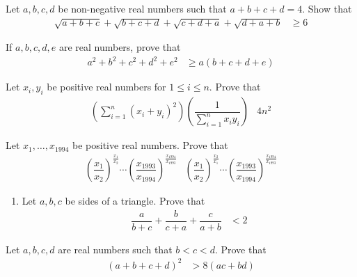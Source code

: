 \documentclass{subfile}
\begin{document}
		\begin{problem}
			Let $a,b,c,d$ be non-negative real numbers such that $a+b+c+d=4$. Show that
				\begin{align*}
					\sqrt{a+b+c}+\sqrt{b+c+d}+\sqrt{c+d+a}+\sqrt{d+a+b}
						& \geq 6
				\end{align*}
		\end{problem}
	
		\begin{problem}
			If $a,b,c,d,e$ are real numbers, prove that
				\begin{align*}
					a^{2}+b^{2}+c^{2}+d^{2}+e^{2}
						& \geq a(b+c+d+e)
				\end{align*}
		\end{problem}
	
		\begin{problem}
			Let $x_{i},y_{i}$ be positive real numbers for $1\leq i\leq n$. Prove that
				\begin{align*}
					\left(\sum_{i=1}^{n}(x_{i}+y_{i})^{2}\right)\left(\dfrac{1}{\sum_{i=1}^{n}x_{i}y_{i}}\right)
						& 4n^{2}
				\end{align*}
		\end{problem}
	
		\begin{problem}
			Let $x_{1},\ldots,x_{1994}$ be positive real numbers. Prove that
				\begin{align*}
					\left(\dfrac{x_{1}}{x_{2}}\right)^{\frac{x_{1}}{x_{2}}}\cdots\left(\dfrac{x_{1993}}{x_{1994}}\right)^{\frac{x_{1994}}{x_{1993}}}
						& \left(\dfrac{x_{1}}{x_{2}}\right)^{\frac{x_{2}}{x_{1}}}\cdots\left(\dfrac{x_{1993}}{x_{1994}}\right)^{\frac{x_{1994}}{x_{1993}}}
				\end{align*}
		\end{problem}
	
		\begin{problem}
			\begin{enumerate}[1.]
				\item Let $a,b,c$ be sides of a triangle. Prove that
					\begin{align*}
						\dfrac{a}{b+c}+\dfrac{b}{c+a}+\dfrac{c}{a+b}
							& < 2
					\end{align*}
			\end{enumerate}
		\end{problem}
	
		\begin{problem}
			Let $a,b,c,d$ are real numbers such that $b<c<d$. Prove that
				\begin{align*}
					(a+b+c+d)^{2}
						& > 8(ac+bd)
				\end{align*}
		\end{problem}
\end{document}
